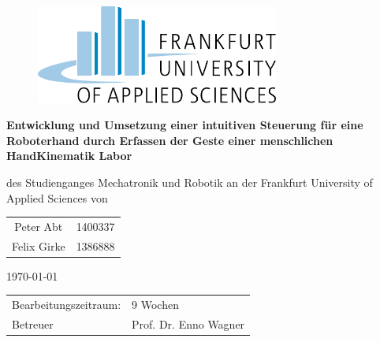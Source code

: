 \documentclass[a4paper,12pt,final]{article} %
\numberwithin{equation}{section} %
\numberwithin{figure}{section} %
\numberwithin{table}{section} %
\begin{document}
\begin{center} %
	\begin{figure}[h]
	\begin{center}
		\includegraphics[width=8cm]{Bilder/logo.pdf} %
		\vspace{2cm}
	\end{center}
	\end{figure}
	\begin{Large}	
		\textbf{Entwicklung und Umsetzung einer intuitiven Steuerung für eine Roboterhand durch Erfassen
		der Geste einer menschlichen Hand\linebreak \linebreak Kinematik Labor\\}
		\vspace{1.5cm}
	\end{Large}
	\begin{large}
		des Studienganges Mechatronik und Robotik\linebreak		
		an der Frankfurt University of Applied Sciences\linebreak\linebreak
		von
		\begin{longtable}[b]{c c}
		Peter Abt & 1400337\\
		Felix Girke & 1386888\\
		\end{longtable}
		\vspace{1cm}
		\today\linebreak \linebreak
		\begin{longtable}[b]{p{7.9cm} p{6.9cm}}
		Bearbeitungszeitraum: & 9 Wochen\\
		Betreuer & Prof. Dr. Enno Wagner
		\end{longtable}
	\end{large}
\end{center} 
\thispagestyle{empty}%
\setcounter{page}{0}
\newpage
{}
\end{document}
